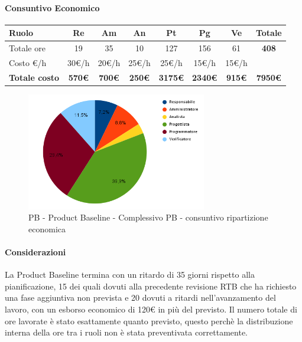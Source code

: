 \paragraph{Consuntivo Economico}
\begin{center}
	\renewcommand{\arraystretch}{1.8}
	\begin{tabular}{ |m{6em}|c|c|c|c|c|c|c| }
	\hline
	\textbf{Ruolo} & \textbf{Re} & \textbf{Am} &  \textbf{An} &  \textbf{Pt} &  \textbf{Pg} &  \textbf{Ve} &  \textbf{Totale}\\
    \hline
    Totale ore & 19 & 35 & 10 & 127 & 156 & 61 & \textbf{408}\\
    \hline
    Costo \euro/h & 30\euro/h & 20\euro/h & 25\euro/h & 25\euro/h & 15\euro/h & 15\euro/h & \\
    \hline
    \textbf{Totale costo} & \textbf{570\euro} & \textbf{700\euro} &  \textbf{250\euro} & \textbf{3175\euro} &  \textbf{2340\euro} &  \textbf{915\euro} &  \textbf{7950\euro} \\
    \hline
	\end{tabular}

    \begin{figure}[H]
        \centering\includegraphics[width=0.7\textwidth, height=0.7\textheight, keepaspectratio]{images/consuntivo/consuntivo-PB-costo-totale.png}
        \caption{PB - Product Baseline - Complessivo PB - consuntivo ripartizione economica}
    \end{figure}
\end{center}

\paragraph{Considerazioni} \hfill \break
La Product Baseline termina con un ritardo di 35 giorni rispetto alla pianificazione, 15 dei quali dovuti alla precedente revisione RTB che ha richiesto una fase aggiuntiva non prevista e 20 dovuti a ritardi nell'avanzamento del lavoro, con un esborso economico di 120€ in più del previsto. Il numero totale di ore lavorate è stato esattamente quanto previsto, questo perchè la distribuzione interna della ore tra i ruoli non è stata preventivata correttamente.

